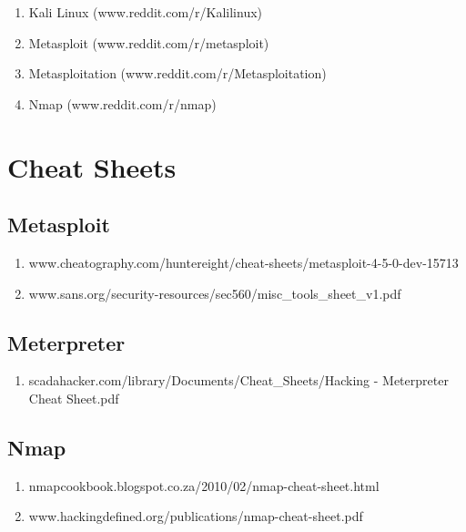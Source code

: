 \documentclass[a4paper]{article}
\begin{document}
\begin{enumerate}
	\item Kali Linux (www.reddit.com/r/Kalilinux)
	\item Metasploit (www.reddit.com/r/metasploit)
	\item Metasploitation (www.reddit.com/r/Metasploitation) 
    \item Nmap (www.reddit.com/r/nmap)
\end{enumerate}

\section{Cheat Sheets}

\subsection{Metasploit}
\begin{enumerate}
	\item www.cheatography.com/huntereight/cheat-sheets/metasploit-4-5-0-dev-15713
	\item www.sans.org/security-resources/sec560/misc\_tools\_sheet\_v1.pdf
\end{enumerate}

\subsection{Meterpreter}
\begin{enumerate}
	\item scadahacker.com/library/Documents/Cheat\_Sheets/Hacking - Meterpreter Cheat  Sheet.pdf
\end{enumerate}

\subsection{Nmap}
\begin{enumerate}
	\item nmapcookbook.blogspot.co.za/2010/02/nmap-cheat-sheet.html
	\item www.hackingdefined.org/publications/nmap-cheat-sheet.pdf
\end{enumerate}
\end{document}
